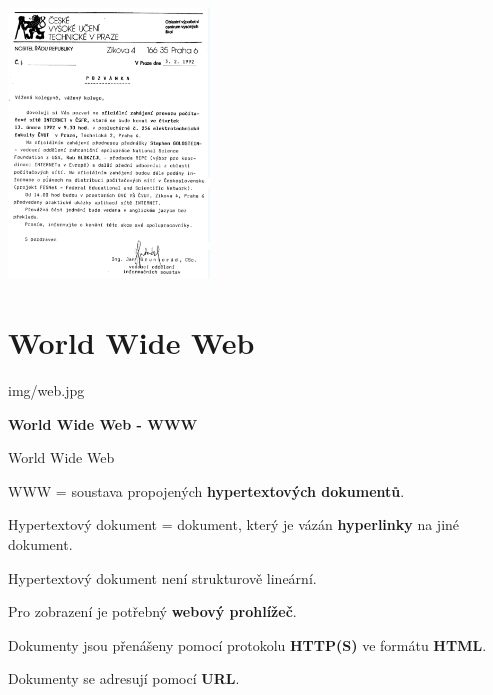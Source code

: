 \documentclass[aspectratio=1610]{beamer}
\begin{document}
\begin{frame}
    \begin{center}
    \includegraphics[width=0.4\textwidth]{img/cvut.png}
    \end{center}
\end{frame}

\section{World Wide Web}

\begin{frameImg}[width]{img/web.jpg}
    \vspace*{60mm}
    \begin{cardTiny}
        \vspace*{\fill}
        \begin{center}
            \textbf{World Wide Web - WWW}
        \end{center}
    \end{cardTiny}
\end{frameImg}

\begin{frame}{World Wide Web}
    \begin{cardTiny}
        \begin{flushleft}
            WWW = soustava propojených \textbf{hypertextových dokumentů}.

            \vspace{2ex}
            Hypertextový dokument = dokument, který je vázán \textbf{hyperlinky} na jiné dokument.

            Hypertextový dokument není strukturově lineární.

            \vspace{2ex}
            Pro zobrazení je potřebný \textbf{webový prohlížeč}.

            \vspace{2ex}
            Dokumenty jsou přenášeny pomocí protokolu \textbf{HTTP(S)} ve formátu \textbf{HTML}.

            \vspace{2ex}
            Dokumenty se adresují pomocí \textbf{URL}.
        \end{flushleft}
    \end{cardTiny}
\end{frame}
\end{document}
